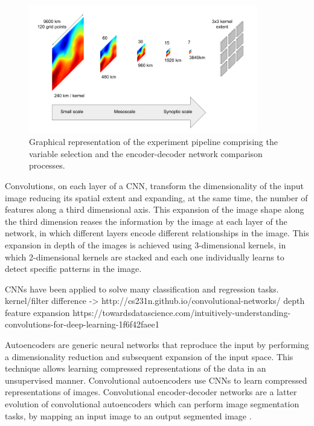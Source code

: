 \documentclass[twocol]{ametsoc}
\begin{document}
\begin{figure}[h]
 \centerline{\includegraphics[width=10cm]{cnn_scales.png}}
  \caption{Graphical representation of the experiment pipeline comprising the variable selection and the encoder-decoder network comparison processes.}\label{cnn_scales}
\end{figure}

Convolutions, on each layer of a CNN, transform the dimensionality of the input image reducing its spatial extent and expanding, at the same time, the number of features along a third dimensional axis. This expansion of the image shape along the third dimension reases the information by the image at each layer of the network, in which different layers encode different relationships in the image. This expansion in depth of the images is achieved using 3-dimensional kernels, in which 2-dimensional kernels are stacked and each one individually learns to detect specific patterns in the image.

CNNs have been applied to solve many classification \citep{} and regression tasks.
kernel/filter difference -> http://cs231n.github.io/convolutional-networks/
depth feature expansion
https://towardsdatascience.com/intuitively-understanding-convolutions-for-deep-learning-1f6f42faee1



Autoencoders \citep{hinton2006reducing} are generic neural networks that reproduce the input by performing a dimensionality reduction and subsequent expansion of the input space. This technique allows learning compressed representations of the data in an unsupervised manner. Convolutional autoencoders \citep{masci2011stacked} use CNNs to learn compressed representations of images. Convolutional encoder-decoder networks are a latter evolution of convolutional autoencoders which can perform image segmentation tasks, by mapping an input image to an output segmented image \citep{long2015fully}.
\end{document}
